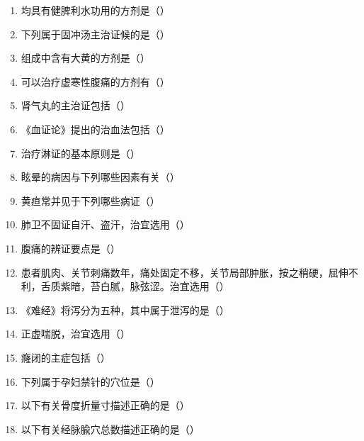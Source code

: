 \documentclass[a4paper,11pt]{ctexart}
\begin{document}
\begin{enumerate}[resume]
      \item 均具有健脾利水功用的方剂是（\quad）
      \item 下列属于固冲汤主治证候的是（\quad）
      \item 组成中含有大黄的方剂是（\quad）
      \item 可以治疗虚寒性腹痛的方剂有（\quad）
      \item 肾气丸的主治证包括（\quad）
      \item 《血证论》提出的治血法包括（\quad）
      \item 治疗淋证的基本原则是（\quad）
      \item 眩晕的病因与下列哪些因素有关（\quad）
      \item 黄疸常并见于下列哪些病证（\quad）
      \item 肺卫不固证自汗、盗汗，治宜选用（\quad）
      \item 腹痛的辨证要点是（\quad）
      \item 患者肌肉、关节刺痛数年，痛处固定不移，关节局部肿胀，按之稍硬，屈伸不利，舌质紫暗，苔白腻，脉弦涩。治宜选用（\quad）
      \item 《难经》将泻分为五种，其中属于泄泻的是（\quad）
      \item 正虚喘脱，治宜选用（\quad）
      \item 癃闭的主症包括（\quad）
      \item 下列属于孕妇禁针的穴位是（\quad）
      \item 以下有关骨度折量寸描述正确的是（\quad）
      \item 以下有关经脉腧穴总数描述正确的是（\quad）

\end{enumerate}
\end{document}
